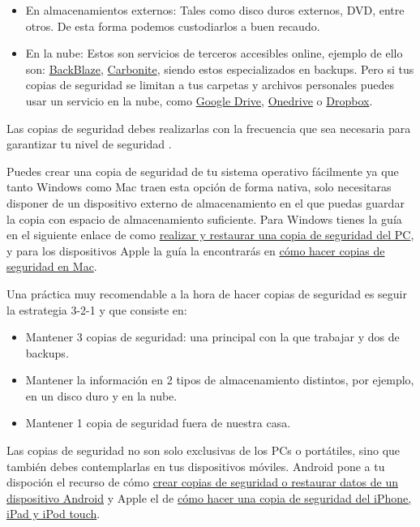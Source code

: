 \documentclass[
  spanish,
  a4paper,
  openany]{book}
\begin{document}
\begin{itemize}
\item
  En almacenamientos externos: Tales como disco duros externos, DVD, entre otros. De esta forma podemos custodiarlos a buen recaudo.
\item
  En la nube: Estos son servicios de terceros accesibles online, ejemplo de ello son: \href{https://www.backblaze.com/home-1.html}{BackBlaze}, \href{https://www.carbonite.com/}{Carbonite}, siendo estos especializados en backups. Pero si tus copias de seguridad se limitan a tus carpetas y archivos personales puedes usar un servicio en la nube, como \href{https://www.google.com/intl/en_in/drive/}{Google Drive}, \href{https://www.microsoft.com/en-us/microsoft-365/onedrive/online-cloud-storage}{Onedrive} o \href{https://www.dropbox.com/}{Dropbox}.
\end{itemize}

Las copias de seguridad debes realizarlas con la frecuencia que sea necesaria para garantizar tu nivel de seguridad \citep{tipos-copia-seguridad}.

Puedes crear una copia de seguridad de tu sistema operativo fácilmente ya que tanto Windows como Mac traen esta opción de forma nativa, solo necesitaras disponer de un dispositivo externo de almacenamiento en el que puedas guardar la copia con espacio de almacenamiento suficiente. Para Windows tienes la guía en el siguiente enlace de como \href{https://support.microsoft.com/es-es/windows/realizar-y-restaurar-una-copia-de-seguridad-del-pc-ac359b36-7015-4694-de9a-c5eac1ce9d9c}{realizar y restaurar una copia de seguridad del PC}, y para los dispositivos Apple la guía la encontrarás en \href{https://support.apple.com/es-es/mac-backup}{cómo hacer copias de seguridad en Mac}.

Una práctica muy recomendable a la hora de hacer copias de seguridad es seguir la estrategia 3-2-1 \citep{INCI-copia-3-2-1} y que consiste en:

\begin{itemize}
\item
  Mantener 3 copias de seguridad: una principal con la que trabajar y dos de backups.
\item
  Mantener la información en 2 tipos de almacenamiento distintos, por ejemplo, en un disco duro y en la nube.
\item
  Mantener 1 copia de seguridad fuera de nuestra casa.
\end{itemize}

Las copias de seguridad no son solo exclusivas de los PCs o portátiles, sino que también debes contemplarlas en tus dispositivos móviles. Android pone a tu dispoción el recurso de cómo \href{https://support.google.com/android/answer/2819582?hl=es\&visit_id=637514255756661953-3969236140\&rd=1}{crear copias de seguridad o restaurar datos de un dispositivo Android} y Apple el de \href{https://support.apple.com/es-es/HT203977}{cómo hacer una copia de seguridad del iPhone, iPad y iPod touch}.
\end{document}

